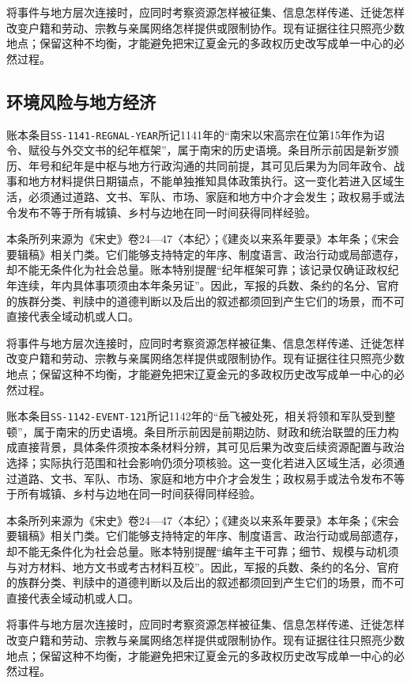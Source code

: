 将事件与地方层次连接时，应同时考察资源怎样被征集、信息怎样传递、迁徙怎样改变户籍和劳动、宗教与亲属网络怎样提供或限制协作。现有证据往往只照亮少数地点；保留这种不均衡，才能避免把宋辽夏金元的多政权历史改写成单一中心的必然过程。

\subsection{环境风险与地方经济}

账本条目\texttt{SS-1141-REGNAL-YEAR}所记1141年的“南宋以宋高宗在位第15年作为诏令、赋役与外交文书的纪年框架”，属于南宋的历史语境。条目所示前因是新岁颁历、年号和纪年是中枢与地方行政沟通的共同前提，其可见后果为为同年政令、战事和地方材料提供日期锚点，不能单独推知具体政策执行。这一变化若进入区域生活，必须通过道路、文书、军队、市场、家庭和地方中介才会发生；政权易手或法令发布不等于所有城镇、乡村与边地在同一时间获得同样经验。

本条所列来源为《宋史》卷24—47〈本纪〉；《建炎以来系年要录》本年条；《宋会要辑稿》相关门类。它们能够支持特定的年序、制度语言、政治行动或局部遗存，却不能无条件化为社会总量。账本特别提醒“纪年框架可靠；该记录仅确证政权纪年连续，年内具体事项须由本年条另证”。因此，军报的兵数、条约的名分、官府的族群分类、判牍中的道德判断以及后出的叙述都须回到产生它们的场景，而不可直接代表全域动机或人口。

将事件与地方层次连接时，应同时考察资源怎样被征集、信息怎样传递、迁徙怎样改变户籍和劳动、宗教与亲属网络怎样提供或限制协作。现有证据往往只照亮少数地点；保留这种不均衡，才能避免把宋辽夏金元的多政权历史改写成单一中心的必然过程。

账本条目\texttt{SS-1142-EVENT-121}所记1142年的“岳飞被处死，相关将领和军队受到整顿”，属于南宋的历史语境。条目所示前因是前期边防、财政和统治联盟的压力构成直接背景，具体条件须按本条材料分辨，其可见后果为改变后续资源配置与政治选择；实际执行范围和社会影响仍须分项核验。这一变化若进入区域生活，必须通过道路、文书、军队、市场、家庭和地方中介才会发生；政权易手或法令发布不等于所有城镇、乡村与边地在同一时间获得同样经验。

本条所列来源为《宋史》卷24—47〈本纪〉；《建炎以来系年要录》本年条；《宋会要辑稿》相关门类。它们能够支持特定的年序、制度语言、政治行动或局部遗存，却不能无条件化为社会总量。账本特别提醒“编年主干可靠；细节、规模与动机须与对方材料、地方文书或考古材料互校”。因此，军报的兵数、条约的名分、官府的族群分类、判牍中的道德判断以及后出的叙述都须回到产生它们的场景，而不可直接代表全域动机或人口。

将事件与地方层次连接时，应同时考察资源怎样被征集、信息怎样传递、迁徙怎样改变户籍和劳动、宗教与亲属网络怎样提供或限制协作。现有证据往往只照亮少数地点；保留这种不均衡，才能避免把宋辽夏金元的多政权历史改写成单一中心的必然过程。


